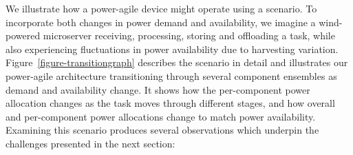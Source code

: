 

We illustrate how a power-agile device might operate using a scenario. To
incorporate both changes in power demand and availability, we imagine a
wind-powered microserver receiving, processing, storing and offloading a
task, while also experiencing fluctuations in power availability due to
harvesting variation. Figure~\ref{figure-transitiongraph} describes the
scenario in detail and illustrates our power-agile architecture transitioning
through several component ensembles as demand and availability change. It
shows how the per-component power allocation changes as the task moves
through different stages, and how overall and per-component power allocations
change to match power availability. Examining this scenario produces several
observations which underpin the challenges presented in the next section:

